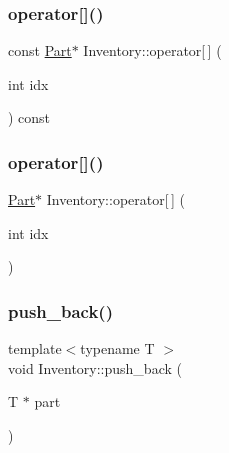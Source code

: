 \mbox{\label{class_inventory_a99b8be25beb3530c47d1faa913633979}} 
\subsubsection{\texorpdfstring{operator[]()}{operator[]()}\hspace{0.1cm}{\footnotesize\ttfamily [1/2]}}
{\footnotesize\ttfamily const \mbox{\hyperlink{class_part}{Part}}$\ast$ Inventory\+::operator\mbox{[}$\,$\mbox{]} (\begin{DoxyParamCaption}\item[{int}]{idx }\end{DoxyParamCaption}) const\hspace{0.3cm}{\ttfamily [inline]}}

\mbox{\label{class_inventory_a86601b8ee999e78cdeea83431bab8f33}} 
\subsubsection{\texorpdfstring{operator[]()}{operator[]()}\hspace{0.1cm}{\footnotesize\ttfamily [2/2]}}
{\footnotesize\ttfamily \mbox{\hyperlink{class_part}{Part}}$\ast$ Inventory\+::operator\mbox{[}$\,$\mbox{]} (\begin{DoxyParamCaption}\item[{int}]{idx }\end{DoxyParamCaption})\hspace{0.3cm}{\ttfamily [inline]}}

\mbox{\label{class_inventory_a90cb96a50ebc28f0de4a009004e9b192}} 
\subsubsection{\texorpdfstring{push\_back()}{push\_back()}}
{\footnotesize\ttfamily template$<$typename T $>$ \\
void Inventory\+::push\+\_\+back (\begin{DoxyParamCaption}\item[{T $\ast$}]{part }\end{DoxyParamCaption})\hspace{0.3cm}{\ttfamily [inline]}}



